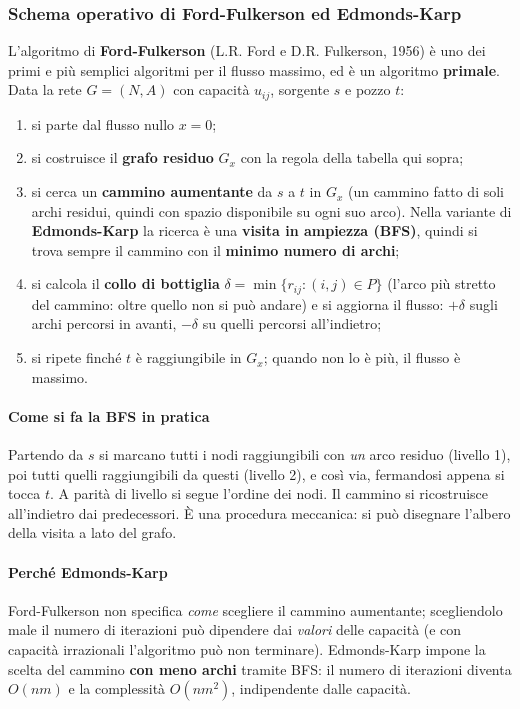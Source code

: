 \documentclass[12pt]{extarticle} %
\begin{document}
\subsubsection{Schema operativo di Ford-Fulkerson ed Edmonds-Karp}
L'algoritmo di \textbf{Ford-Fulkerson} (L.R. Ford e D.R. Fulkerson, 1956) è uno dei primi e più semplici algoritmi per il flusso massimo, ed è un algoritmo \textbf{primale}. Data la rete $G=(N,A)$ con capacità $u_{ij}$, sorgente $s$ e pozzo $t$:
\begin{enumerate}
    \item si parte dal flusso nullo $x = 0$;
    \item si costruisce il \textbf{grafo residuo} $G_x$ con la regola della tabella qui sopra;
    \item si cerca un \textbf{cammino aumentante} da $s$ a $t$ in $G_x$ (un cammino fatto di soli archi residui, quindi con spazio disponibile su ogni suo arco). Nella variante di \textbf{Edmonds-Karp} la ricerca è una \textbf{visita in ampiezza (BFS)}, quindi si trova sempre il cammino con il \textbf{minimo numero di archi};
    \item si calcola il \textbf{collo di bottiglia} $\delta = \min\{r_{ij} : (i,j)\in P\}$ (l'arco più stretto del cammino: oltre quello non si può andare) e si aggiorna il flusso: $+\delta$ sugli archi percorsi in avanti, $-\delta$ su quelli percorsi all'indietro;
    \item si ripete finché $t$ è raggiungibile in $G_x$; quando non lo è più, il flusso è massimo.
\end{enumerate}

\paragraph{Come si fa la BFS in pratica}
Partendo da $s$ si marcano tutti i nodi raggiungibili con \emph{un} arco residuo (livello 1), poi tutti quelli raggiungibili da questi (livello 2), e così via, fermandosi appena si tocca $t$. A parità di livello si segue l'ordine dei nodi. Il cammino si ricostruisce all'indietro dai predecessori. È una procedura meccanica: si può disegnare l'albero della visita a lato del grafo.

\paragraph{Perché Edmonds-Karp}
Ford-Fulkerson non specifica \textit{come} scegliere il cammino aumentante; scegliendolo male il numero di iterazioni può dipendere dai \textit{valori} delle capacità (e con capacità irrazionali l'algoritmo può non terminare). Edmonds-Karp impone la scelta del cammino \textbf{con meno archi} tramite BFS: il numero di iterazioni diventa $O(nm)$ e la complessità $O(nm^2)$, indipendente dalle capacità.
\end{document}
